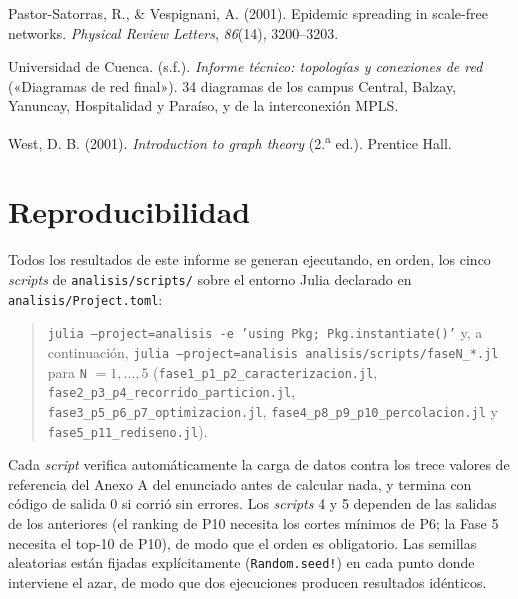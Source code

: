 \documentclass[10pt,a4paper]{extarticle}
\newcommand{\code}[1]{\texttt{\small #1}}
\begin{document}
\begin{list}{}{\leftmargin=1.2cm \itemindent=-1.2cm \itemsep=2mm}
\item Pastor-Satorras, R., \& Vespignani, A. (2001). Epidemic spreading in scale-free
networks. \textit{Physical Review Letters}, \textit{86}(14), 3200--3203.

\item Universidad de Cuenca. (s.f.). \textit{Informe técnico: topologías y conexiones de red}
(«Diagramas de red final»). 34 diagramas de los campus Central, Balzay, Yanuncay,
Hospitalidad y Paraíso, y de la interconexión MPLS.

\item West, D. B. (2001). \textit{Introduction to graph theory} (2.\textsuperscript{a} ed.).
Prentice Hall.

\end{list}

\newpage

\appendix
\small
\section{Reproducibilidad}
\label{anx:repro}

Todos los resultados de este informe se generan ejecutando, en orden, los cinco
\textit{scripts} de \code{analisis/scripts/} sobre el entorno Julia declarado en
\code{analisis/Project.toml}:

\begin{quote}
\code{julia --project=analisis -e 'using Pkg; Pkg.instantiate()'} y, a continuación,
\code{julia --project=analisis analisis/scripts/faseN\_*.jl} para \code{N} $=1,\dots,5$
(\code{fase1\_p1\_p2\_caracterizacion.jl}, \code{fase2\_p3\_p4\_recorrido\_particion.jl},
\code{fase3\_p5\_p6\_p7\_optimizacion.jl}, \code{fase4\_p8\_p9\_p10\_percolacion.jl} y
\code{fase5\_p11\_rediseno.jl}).
\end{quote}

Cada \textit{script} verifica automáticamente la carga de datos contra los trece valores de
referencia del Anexo A del enunciado antes de calcular nada, y termina con código de salida 0
si corrió sin errores. Los \textit{scripts} 4 y 5 dependen de las salidas de los anteriores
(el ranking de P10 necesita los cortes mínimos de P6; la Fase 5 necesita el top-10 de P10),
de modo que el orden es obligatorio. Las semillas aleatorias están fijadas explícitamente
(\code{Random.seed!}) en cada punto donde interviene el azar, de modo que dos ejecuciones
producen resultados idénticos.
\end{document}
